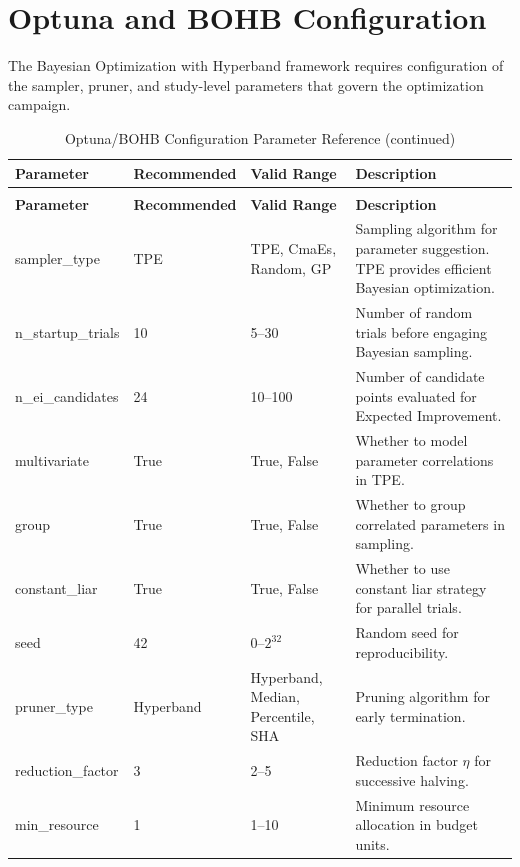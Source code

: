 \section{Optuna and BOHB Configuration}
\label{sec:optuna_config}

The Bayesian Optimization with Hyperband framework requires configuration of the sampler, pruner, and study-level parameters that govern the optimization campaign.

\begin{longtable}{p{3.5cm}p{2cm}p{2.5cm}p{5.5cm}}
\caption{Optuna/BOHB Configuration Parameter Reference} \label{tab:optuna_config} \\
\toprule
\textbf{Parameter} & \textbf{Recommended} & \textbf{Valid Range} & \textbf{Description} \\
\midrule
\endfirsthead
\caption[]{Optuna/BOHB Configuration Parameter Reference (continued)} \\
\toprule
\textbf{Parameter} & \textbf{Recommended} & \textbf{Valid Range} & \textbf{Description} \\
\midrule
\endhead
\bottomrule
\endfoot
\bottomrule
\endlastfoot
sampler\_type & TPE & TPE, CmaEs, Random, GP & Sampling algorithm for parameter suggestion. TPE provides efficient Bayesian optimization. \\
\addlinespace
n\_startup\_trials & 10 & 5--30 & Number of random trials before engaging Bayesian sampling. \\
\addlinespace
n\_ei\_candidates & 24 & 10--100 & Number of candidate points evaluated for Expected Improvement. \\
\addlinespace
multivariate & True & True, False & Whether to model parameter correlations in TPE. \\
\addlinespace
group & True & True, False & Whether to group correlated parameters in sampling. \\
\addlinespace
constant\_liar & True & True, False & Whether to use constant liar strategy for parallel trials. \\
\addlinespace
seed & 42 & 0--$2^{32}$ & Random seed for reproducibility. \\
\addlinespace
pruner\_type & Hyperband & Hyperband, Median, Percentile, SHA & Pruning algorithm for early termination. \\
\addlinespace
reduction\_factor & 3 & 2--5 & Reduction factor $\eta$ for successive halving. \\
\addlinespace
min\_resource & 1 & 1--10 & Minimum resource allocation in budget units. \\

\end{longtable}
